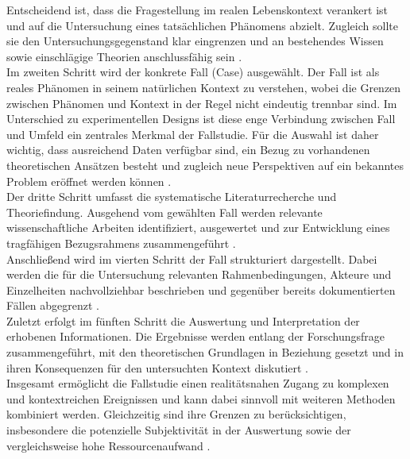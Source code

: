  \cite{pfeiffer2023fallstudie}

Entscheidend ist, dass die Fragestellung im realen Lebenskontext verankert ist und auf die Untersuchung eines tatsächlichen Phänomens abzielt.
Zugleich sollte sie den Untersuchungsgegenstand klar eingrenzen und an bestehendes Wissen sowie einschlägige Theorien anschlussfähig sein \cite{pfeiffer2023fallstudie}. \\

Im zweiten Schritt wird der konkrete Fall (Case) ausgewählt.
Der Fall ist als reales Phänomen in seinem natürlichen Kontext zu verstehen, wobei die Grenzen zwischen Phänomen und Kontext in der Regel nicht eindeutig trennbar sind.
Im Unterschied zu experimentellen Designs ist diese enge Verbindung zwischen Fall und Umfeld ein zentrales Merkmal der Fallstudie.
Für die Auswahl ist daher wichtig, dass ausreichend Daten verfügbar sind, ein Bezug zu vorhandenen theoretischen Ansätzen besteht und zugleich neue Perspektiven auf ein bekanntes Problem eröffnet werden können \cite{hollweck2016casestudy}. \\

Der dritte Schritt umfasst die systematische Literaturrecherche und Theoriefindung.
Ausgehend vom gewählten Fall werden relevante wissenschaftliche Arbeiten identifiziert, ausgewertet und zur Entwicklung eines tragfähigen Bezugsrahmens zusammengeführt \cite{pfeiffer2023fallstudie}. \\

Anschließend wird im vierten Schritt der Fall strukturiert dargestellt.
Dabei werden die für die Untersuchung relevanten Rahmenbedingungen, Akteure und Einzelheiten nachvollziehbar beschrieben und gegenüber bereits dokumentierten Fällen abgegrenzt \cite{pfeiffer2023fallstudie}. \\

Zuletzt erfolgt im fünften Schritt die Auswertung und Interpretation der erhobenen Informationen.
Die Ergebnisse werden entlang der Forschungsfrage zusammengeführt, mit den theoretischen Grundlagen in Beziehung gesetzt und in ihren Konsequenzen für den untersuchten Kontext diskutiert \cite{pfeiffer2023fallstudie,hollweck2016casestudy}. \\

Insgesamt ermöglicht die Fallstudie einen realitätsnahen Zugang zu komplexen und kontextreichen Ereignissen und kann dabei sinnvoll mit weiteren Methoden kombiniert werden.
Gleichzeitig sind ihre Grenzen zu berücksichtigen, insbesondere die potenzielle Subjektivität in der Auswertung sowie der vergleichsweise hohe Ressourcenaufwand \cite{hertrich2020forschungsmethodefallstudien,hollweck2016casestudy}. \\

